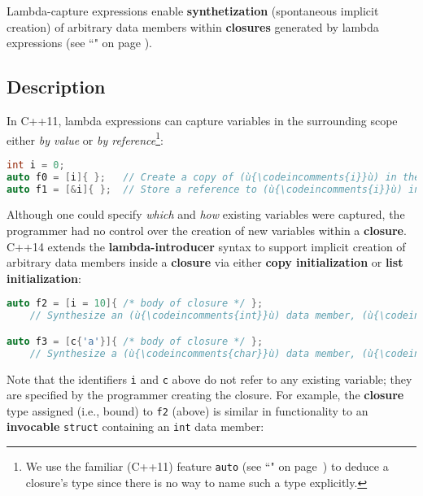

Lambda-capture expressions enable \textbf{synthetization} (spontaneous implicit creation) of
arbitrary data members within \textbf{closures} generated by
lambda expressions (see ``" on page \pageref{lambda}).

\subsection[Description]{Description}\label{description}

In C++11, lambda expressions can capture variables in the
surrounding scope either \emph{by value} or \emph{by reference}{\cprotect\footnote{We use the familiar (C++11) feature
  \texttt{auto} (see ``" on page~\pageref{auto-feature}) to deduce a closure's type since there is no
  way to name such a type explicitly.}}:

\begin{lstlisting}[language=C++]
int i = 0;
auto f0 = [i]{ };   // Create a copy of (ù{\codeincomments{i}}ù) in the generated closure named (ù{\codeincomments{f0}}ù).
auto f1 = [&i]{ };  // Store a reference to (ù{\codeincomments{i}}ù) in the generated closure named (ù{\codeincomments{f1}}ù).
\end{lstlisting}

\noindent Although one could specify \emph{which} and \emph{how} existing
variables were captured, the programmer had no control over the creation
of new variables within a \textbf{closure}. C++14 extends the
\textbf{lambda-introducer} syntax to support implicit creation of
arbitrary data members inside a \textbf{closure} via either \textbf{copy
initialization} or \textbf{list initialization}:

\begin{lstlisting}[language=C++]
auto f2 = [i = 10]{ /* body of closure */ };
    // Synthesize an (ù{\codeincomments{int}}ù) data member, (ù{\codeincomments{i}}ù), initialized with (ù{\codeincomments{10}}ù) in the closure.

auto f3 = [c{'a'}]{ /* body of closure */ };
    // Synthesize a (ù{\codeincomments{char}}ù) data member, (ù{\codeincomments{c}}ù), initialized with (ù{\codeincomments{'a'}}ù) in the closure.
\end{lstlisting}

\noindent Note that the identifiers \texttt{i} and \texttt{c} above do not refer
to any existing variable; they are specified by the programmer creating
the closure. For example, the \textbf{closure} type assigned (i.e.,
bound) to \texttt{f2} (above) is similar in functionality to an
\textbf{invocable} \texttt{struct} containing an \texttt{int} data
member:

